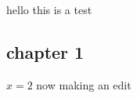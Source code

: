 \documentclass{article}
\begin{document}
hello this is a test
\subsection{chapter 1}
$x=2$
now making an edit
\end{document}
